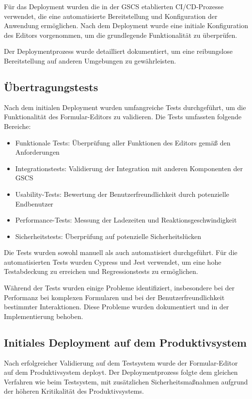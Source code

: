 \documentclass[a4paper,11pt]{article}
\begin{document}
Für das Deployment wurden die in der GSCS etablierten CI/CD-Prozesse verwendet, die eine automatisierte Bereitstellung und Konfiguration der Anwendung ermöglichen. Nach dem Deployment wurde eine initiale Konfiguration des Editors vorgenommen, um die grundlegende Funktionalität zu überprüfen.

Der Deploymentprozess wurde detailliert dokumentiert, um eine reibungslose Bereitstellung auf anderen Umgebungen zu gewährleisten.

\subsection{Übertragungstests}
Nach dem initialen Deployment wurden umfangreiche Tests durchgeführt, um die Funktionalität des Formular-Editors zu validieren. Die Tests umfassten folgende Bereiche:

\begin{itemize}
  \item Funktionale Tests: Überprüfung aller Funktionen des Editors gemäß den Anforderungen
  \item Integrationstests: Validierung der Integration mit anderen Komponenten der GSCS
  \item Usability-Tests: Bewertung der Benutzerfreundlichkeit durch potenzielle Endbenutzer
  \item Performance-Tests: Messung der Ladezeiten und Reaktionsgeschwindigkeit
  \item Sicherheitstests: Überprüfung auf potenzielle Sicherheitslücken
\end{itemize}

Die Tests wurden sowohl manuell als auch automatisiert durchgeführt. Für die automatisierten Tests wurden Cypress und Jest verwendet, um eine hohe Testabdeckung zu erreichen und Regressionstests zu ermöglichen.

Während der Tests wurden einige Probleme identifiziert, insbesondere bei der Performanz bei komplexen Formularen und bei der Benutzerfreundlichkeit bestimmter Interaktionen. Diese Probleme wurden dokumentiert und in der Implementierung behoben.

\subsection{Initiales Deployment auf dem Produktivsystem}
Nach erfolgreicher Validierung auf dem Testsystem wurde der Formular-Editor auf dem Produktivsystem deployt. Der Deploymentprozess folgte dem gleichen Verfahren wie beim Testsystem, mit zusätzlichen Sicherheitsmaßnahmen aufgrund der höheren Kritikalität des Produktivsystems.
\end{document}
